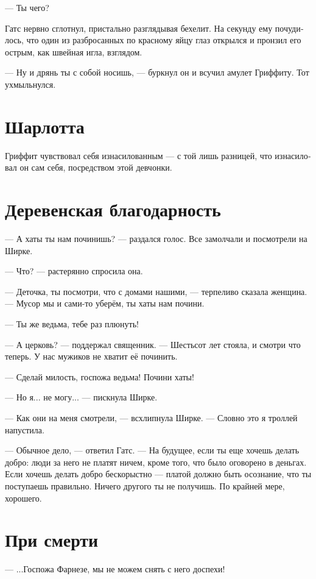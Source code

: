 \documentclass[a4paper,12pt,fleqn]{book}\usepackage{polyglossia}\setdefaultlanguage[babelshorthands=true]{russian}\setotherlanguage{english}\defaultfontfeatures{Ligatures=TeX,Mapping=tex-text}\usepackage{xcolor}\newcommand{\ml}[3]{#2}
\newcommand{\asterism}{\vspace{1em}{\centering\Large\bfseries$\ast~\ast~\ast$\par}\vspace{1em}}
\begin{document}
--- Ты чего?

Гатс нервно сглотнул, пристально разглядывая бехелит.
На секунду ему почудилось, что один из разбросанных по красному яйцу глаз открылся и пронзил его острым, как швейная игла, взглядом.

--- Ну и дрянь ты с собой носишь, --- буркнул он и всучил амулет Гриффиту.
Тот ухмыльнулся.

\section{Шарлотта}

Гриффит чувствовал себя изнасилованным --- с той лишь разницей, что изнасиловал он сам себя, посредством этой девчонки.

\section{Деревенская благодарность}

--- А хаты ты нам починишь? --- раздался голос. 
Все замолчали и посмотрели на Ширке.

--- Что? --- растерянно спросила она.

--- Деточка, ты посмотри, что с домами нашими, --- терпеливо сказала женщина.
--- Мусор мы и сами-то уберём, ты хаты нам почини.

--- Ты же ведьма, тебе раз плюнуть!

--- А церковь? --- поддержал священник. --- Шестьсот лет стояла, и смотри что теперь.
У нас мужиков не хватит её починить.

--- Сделай милость, госпожа ведьма!
Почини хаты!

--- Но я... не могу... --- пискнула Ширке.

\asterism

--- Как они на меня смотрели, --- всхлипнула Ширке.
--- Словно это я троллей напустила.

--- Обычное дело, --- ответил Гатс.
--- На будущее, если ты еще хочешь делать добро: люди за него не платят ничем, кроме того, что было оговорено в деньгах.
Если хочешь делать добро бескорыстно --- платой должно быть осознание, что ты поступаешь правильно.
Ничего другого ты не получишь.
По крайней мере, хорошего.

\section{При смерти}

--- ...Госпожа Фарнезе, мы не можем снять с него доспехи!
\end{document}
